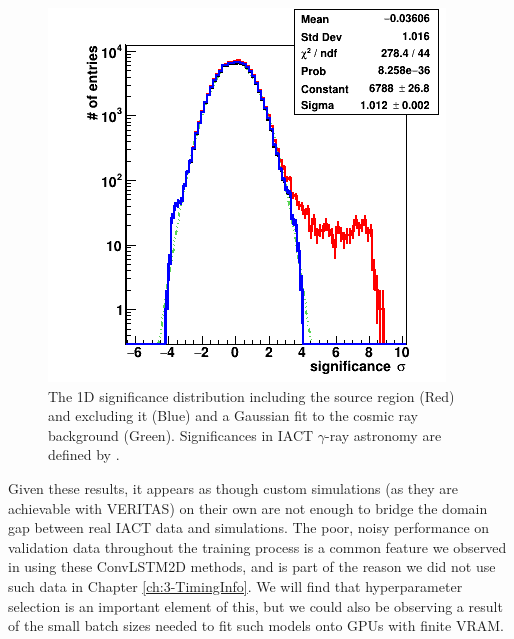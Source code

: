 \begin{figure}[h] 
        \centering \includegraphics[width=\columnwidth]{figures/sig1d.png}

        \caption{
                \label{fig:sig1d} The 1D significance distribution including the source region (Red) and excluding it (Blue) and a Gaussian fit to the cosmic ray background (Green). Significances in IACT $\gamma$-ray astronomy are defined by \cite{LiMa}.
        }
\end{figure}
Given these results, it appears as though custom simulations (as they are achievable with VERITAS) on their own are not enough to bridge the domain gap between real IACT data and simulations. The poor, noisy performance on validation data throughout the training process is a common feature we observed in using these ConvLSTM2D methods, and is part of the reason we did not use such data in Chapter \ref{ch:3-TimingInfo}. We will find that hyperparameter selection is an important element of this, but we could also be observing a result of the small batch sizes needed to fit such models onto GPUs with finite VRAM.

